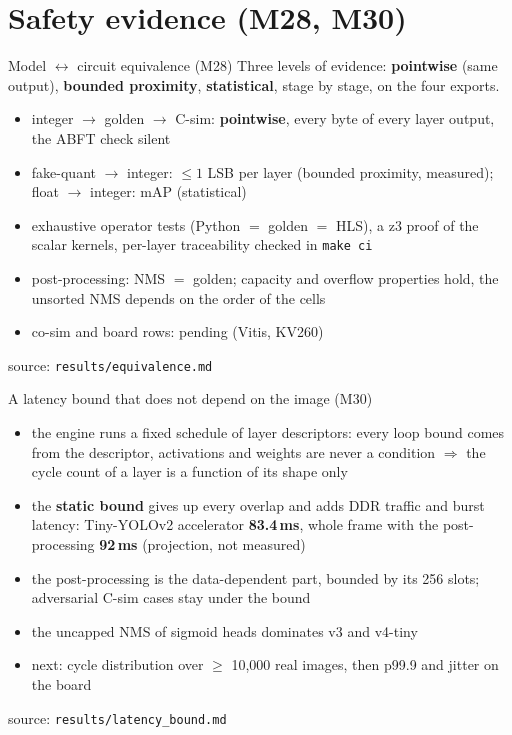 \documentclass[aspectratio=169,11pt]{beamer}
\newcommand\src[1]{\par\vfill{\tiny\color{gray}source: \texttt{#1}}}
\newcommand\proj{\textcolor{orange!80!black}{\small(projection, not measured)}}
\begin{document}
\section{Safety evidence (M28, M30)}

\begin{frame}{Model $\leftrightarrow$ circuit equivalence (M28)}
  \small
  Three levels of evidence: \textbf{pointwise} (same output), \textbf{bounded
  proximity}, \textbf{statistical}, stage by stage, on the four exports.
  \begin{itemize}
    \item integer $\to$ golden $\to$ C-sim: \textbf{pointwise}, every byte of every layer
      output, the ABFT check silent
    \item fake-quant $\to$ integer: $\le 1$ LSB per layer (bounded proximity, measured);
      float $\to$ integer:  mAP (statistical)
    \item exhaustive operator tests (Python $=$ golden $=$ HLS), a z3 proof of the scalar
      kernels, per-layer traceability checked in \texttt{make ci}
    \item post-processing: NMS $=$ golden; capacity and overflow properties hold, the
      unsorted NMS depends on the order of the cells
    \item co-sim and board rows: pending (Vitis, KV260)
  \end{itemize}
  \src{results/equivalence.md}
\end{frame}

\begin{frame}{A latency bound that does not depend on the image (M30)}
  \small
  \begin{itemize}
    \item the engine runs a fixed schedule of layer descriptors: every loop bound comes
      from the descriptor, activations and weights are never a condition $\Rightarrow$ the
      cycle count of a layer is a function of its shape only
    \item the \textbf{static bound} gives up every overlap and adds DDR traffic and burst
      latency: Tiny-YOLOv2 accelerator \textbf{83.4\,ms}, whole frame with the
      post-processing \textbf{92\,ms} \proj
    \item the post-processing is the data-dependent part, bounded by its 256 slots;
      adversarial C-sim cases stay under the bound
    \item the uncapped NMS of sigmoid heads dominates v3 and v4-tiny
    \item next: cycle distribution over $\ge$ 10,000 real images, then p99.9 and jitter on
      the board
  \end{itemize}
  \src{results/latency\_bound.md}
\end{frame}
\end{document}
